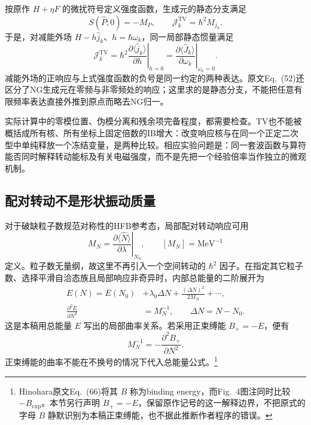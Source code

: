 按原作 \(H+\eta F\) 的微扰符号定义强度函数，生成元的静态分支满足
\begin{equation}\label{eq:2-6-static-tv}
S(\hat P;0)=-M_P,\qquad
\mathcal J_k^{\mathrm{TV}}=\hbar^2M_{j_k}.
\end{equation}
于是，对减能外场 \(H-h\hat j_k\)、\(h=\hbar\omega_k\)，同一局部静态惯量满足
\begin{equation}\label{eq:2-6-tv-susceptibility}
\mathcal J_k^{\mathrm{TV}}
=\hbar^2\left.
\frac{\partial\langle\hat j_k\rangle}{\partial h}
\right|_{h=0}
=\left.
\frac{\partial\langle\hat J_k\rangle}{\partial\omega_k}
\right|_{\omega_k=0}.
\end{equation}
减能外场的正响应与上式强度函数的负号是同一约定的两种表达。原文Eq.~(52)还区分了NG生成元在零频与非零频处的响应；这里求的是静态分支，不能把任意有限频率表达直接外推到原点而略去NG归一。\cite[APS~PDF~p.~5, Eqs.~(49)--(53)]{hinohara-2015-nambu-goldstone-inertia-response}\cite[PDF~pp.~4--5, Eq.~(18)]{petrik-kortelainen-2018-rotational-tv-inertia}

实际计算中的零模位置、伪模分离和残余项完备程度，都需要检查。TV也不能被概括成所有核、所有坐标上固定倍数的IB增大：改变响应核与在同一个正定二次型中单纯释放一个冻结变量，是两种比较。相应实验问题是：同一套波函数与算符能否同时解释转动能标及有关电磁强度，而不是先把一个经验倍率当作独立的微观机制。

\subsection{配对转动不是形状振动质量}\label{sec:2-6-5}

对于破缺粒子数规范对称性的HFB参考态，局部配对转动响应可用
\begin{equation}\label{eq:2-6-pairing-response}
M_N=\left.
\frac{\partial\langle\hat N\rangle}{\partial\lambda}
\right|_{N_0},
\qquad [M_N]=\mathrm{MeV}^{-1}
\end{equation}
定义。粒子数无量纲，故这里不再引入一个空间转动的 \(\hbar^2\) 因子。在指定其它粒子数、选择平滑自洽态族且局部响应非奇异时，内部总能量的二阶展开为
\begin{equation}\label{eq:2-6-pairing-curvature}
\begin{aligned}
E(N)=E(N_0)&+\lambda_0\Delta N
+\frac{(\Delta N)^2}{2M_N}+\cdots,\\
\frac{\partial^2E}{\partial N^2}
&=M_N^{-1},\qquad \Delta N=N-N_0 .
\end{aligned}
\end{equation}
这是本稿用总能量 \(E\) 写出的局部曲率关系。若采用正束缚能 \(B_+=-E\)，便有
\begin{equation}\label{eq:2-6-positive-binding-sign}
M_N^{-1}
=-\frac{\partial^2B_+}{\partial N^2}.
\end{equation}
正束缚能的曲率不能在不换号的情况下代入总能量公式。\footnote{Hinohara原文Eq.~(66)将其 \(B\) 称为binding energy，而Fig.~4图注同时比较 \(-B_{\mathrm{exp}}\)。本节另行声明 \(B_+=-E\)，保留原作记号的这一解释边界，不把原式的字母 \(B\) 静默识别为本稿正束缚能，也不据此推断作者程序的错误。}\cite[APS~PDF~pp.~8--9, Eqs.~(66)--(67), Fig.~4]{hinohara-2015-nambu-goldstone-inertia-response}

